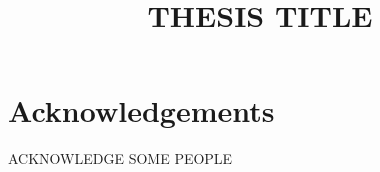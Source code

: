 \documentclass[thesis]{webofc}
\begin{document}
\title{THESIS TITLE}


\author{ 
}


 
\maketitle

















\section{Acknowledgements}
\label{sec:acknowledgments}

ACKNOWLEDGE SOME PEOPLE


 
\end{document}
